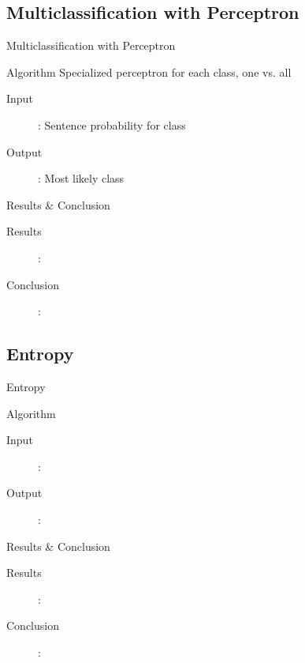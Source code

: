 \documentclass{beamer}
\begin{document}
\subsection{Multiclassification with Perceptron}
\begin{frame}{Multiclassification with Perceptron}
\begin{block}{Algorithm}
Specialized perceptron for each class, one vs. all
\end{block}
\begin{description}
\item[Input]: Sentence probability for class
\item[Output]: Most likely class
\end{description}
\end{frame}
\begin{frame}{Results \& Conclusion}
\begin{description}
\item[Results]: 
\item[Conclusion]:
\end{description}
\end{frame}

\subsection{Entropy}
\begin{frame}{Entropy}
\begin{block}{Algorithm}
\end{block}
\begin{description}
\item[Input]: 
\item[Output]:
\end{description}
\end{frame}
\begin{frame}{Results \& Conclusion}
\begin{description}
\item[Results]: 
\item[Conclusion]:
\end{description}
\end{frame}

\end{document}
